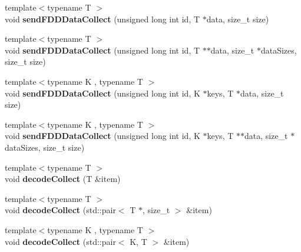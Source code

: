 \begin{DoxyCompactItemize}
\item 
\hypertarget{classfaster_1_1fastComm_a708657fc9279d7a360a5f3102f91b36a}{}{\footnotesize template$<$typename T $>$ }\\void {\bfseries send\+F\+D\+D\+Data\+Collect} (unsigned long int id, T $\ast$data, size\+\_\+t size)\label{classfaster_1_1fastComm_a708657fc9279d7a360a5f3102f91b36a}

\item 
\hypertarget{classfaster_1_1fastComm_acba48eca1ae4a1934dfdd80652c98cf6}{}{\footnotesize template$<$typename T $>$ }\\void {\bfseries send\+F\+D\+D\+Data\+Collect} (unsigned long int id, T $\ast$$\ast$data, size\+\_\+t $\ast$data\+Sizes, size\+\_\+t size)\label{classfaster_1_1fastComm_acba48eca1ae4a1934dfdd80652c98cf6}

\item 
\hypertarget{classfaster_1_1fastComm_ad2e48d9672f566a92d8dcb4222682883}{}{\footnotesize template$<$typename K , typename T $>$ }\\void {\bfseries send\+F\+D\+D\+Data\+Collect} (unsigned long int id, K $\ast$keys, T $\ast$data, size\+\_\+t size)\label{classfaster_1_1fastComm_ad2e48d9672f566a92d8dcb4222682883}

\item 
\hypertarget{classfaster_1_1fastComm_a563c5313ec49a2922ea25dc851e75071}{}{\footnotesize template$<$typename K , typename T $>$ }\\void {\bfseries send\+F\+D\+D\+Data\+Collect} (unsigned long int id, K $\ast$keys, T $\ast$$\ast$data, size\+\_\+t $\ast$data\+Sizes, size\+\_\+t size)\label{classfaster_1_1fastComm_a563c5313ec49a2922ea25dc851e75071}

\item 
\hypertarget{classfaster_1_1fastComm_abbd762b33b892abad86f8f041c4e8b9b}{}{\footnotesize template$<$typename T $>$ }\\void {\bfseries decode\+Collect} (T \&item)\label{classfaster_1_1fastComm_abbd762b33b892abad86f8f041c4e8b9b}

\item 
\hypertarget{classfaster_1_1fastComm_a9ee260039066dc7cd1f89883cf79dd57}{}{\footnotesize template$<$typename T $>$ }\\void {\bfseries decode\+Collect} (std\+::pair$<$ T $\ast$, size\+\_\+t $>$ \&item)\label{classfaster_1_1fastComm_a9ee260039066dc7cd1f89883cf79dd57}

\item 
\hypertarget{classfaster_1_1fastComm_acec19dd57de4e3a802a665712afd671b}{}{\footnotesize template$<$typename K , typename T $>$ }\\void {\bfseries decode\+Collect} (std\+::pair$<$ K, T $>$ \&item)\label{classfaster_1_1fastComm_acec19dd57de4e3a802a665712afd671b}


\end{DoxyCompactItemize}
